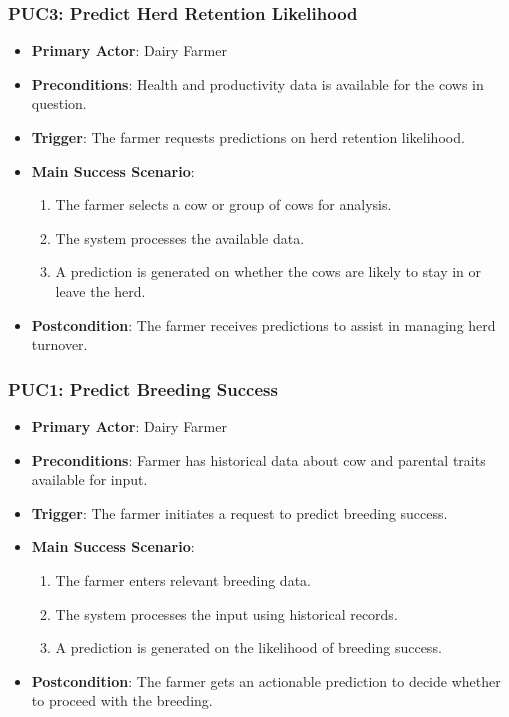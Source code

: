 \documentclass[12pt]{article}
\begin{document}
\subsubsection{PUC3: Predict Herd Retention Likelihood}
\begin{itemize}
    \item \textbf{Primary Actor}: Dairy Farmer
    \item \textbf{Preconditions}: Health and productivity data is available 
    for the cows in question.
    \item \textbf{Trigger}: The farmer requests predictions on herd retention 
    likelihood.
    \item \textbf{Main Success Scenario}:
    \begin{enumerate}
        \item The farmer selects a cow or group of cows for analysis.
        \item The system processes the available data.
        \item A prediction is generated on whether the cows are likely to stay 
        in or leave the herd.
    \end{enumerate}
    \item \textbf{Postcondition}: The farmer receives predictions to assist in 
    managing herd turnover.
\end{itemize}


\subsubsection{PUC1: Predict Breeding Success}
\begin{itemize}
    \item \textbf{Primary Actor}: Dairy Farmer
    \item \textbf{Preconditions}: Farmer has historical data about cow and 
    parental traits available for input.
    \item \textbf{Trigger}: The farmer initiates a request to predict 
    breeding success.
    \item \textbf{Main Success Scenario}:
    \begin{enumerate}
        \item The farmer enters relevant breeding data.
        \item The system processes the input using historical records.
        \item A prediction is generated on the likelihood of breeding success.
    \end{enumerate}
    \item \textbf{Postcondition}: The farmer gets an actionable prediction 
    to decide whether to proceed with the breeding.
\end{itemize}
\end{document}
